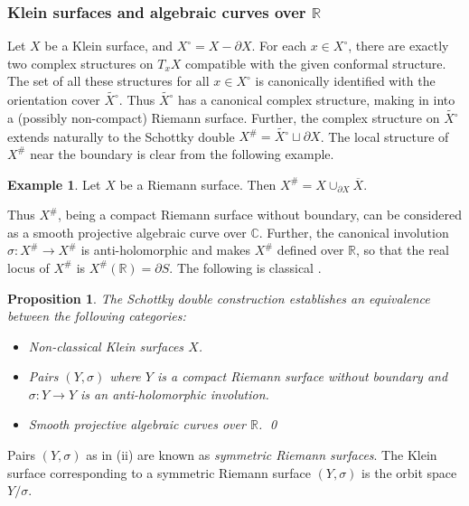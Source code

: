 \documentclass[english,11pt,leqno]{article}
\def\CC{\mathbb{C}}
\def\RR{\mathbb{R}}
\newtheorem{prop}[thm]{Proposition}
\theoremstyle{definition}
\newtheorem{exa}[thm]{Example}
\theoremstyle{remark}
\numberwithin{equation}{section}
\begin{document}
\subsubsection {Klein surfaces and algebraic curves over $\RR$}

Let $X$ be a Klein surface, and $X^\circ=X-\partial X$. For each $x\in X^\circ$, there are exactly
two complex structures on $T_xX$ compatible with the given conformal structure. The set of all these
structures for all $x\in X^\circ$ is canonically identified with the orientation cover $\widetilde{X^\circ}$.
Thus $\widetilde{X^\circ}$ has a canonical complex structure, making in into a (possibly non-compact)
Riemann surface. Further, the complex structure on $\widetilde{X^\circ}$ extends naturally
to the Schottky double $X^\#= \widetilde{X^\circ}\sqcup \partial X$. The local structure of $X^\#$
near the boundary is clear from the following example.

\begin{exa}
Let $X$ be a Riemann surface. Then $X^\# = X\cup_{\partial X} \overline X$. 
\end{exa}

Thus $X^\#$, being a compact Riemann surface without boundary, can be considered as a smooth
projective algebraic curve over $\CC$. Further, the canonical involution $\sigma: X^\#\to X^\#$ is
anti-holomorphic and makes $X^\#$ defined over $\RR$, so that the real locus of $X^\#$ is
$X^\#(\RR)=\partial S$. The following is classical \cite{alling-greenleaf, natanzon, braun}.

\begin{prop}
The Schottky double construction establishes an equivalence between the following categories:
\begin{itemize}
\item[(i)] Non-classical Klein surfaces $X$.

\item[(ii)] Pairs $(Y,\sigma)$ where $Y$ is a compact Riemann surface without boundary and
$\sigma: Y\to Y$ is an anti-holomorphic involution.

\item[(iii)] Smooth projective algebraic curves over $\RR$. \qed

 

\end{itemize}

\end{prop}

Pairs $(Y,\sigma)$ as in (ii) are known as {\em symmetric Riemann surfaces}. The Klein surface
corresponding to a symmetric Riemann surface  $(Y,\sigma)$ is the orbit space $Y/\sigma$. 
\end{document}
